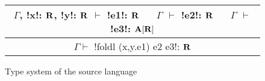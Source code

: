 \begin{figure*}[tb]
    \begin{tabular}{c}
        $\Gamma$, !x!: $\mathbf{R}$, !y!: $\mathbf{R}$ $\vdash$ !e1!: $\mathbf{R}$ 
        $\quad$ $\Gamma$ $\vdash$ !e2!: $\mathbf{R}$
        $\quad$ $\Gamma$ $\vdash$ !e3!: $\mathbf{A}[\mathbf{R}]$
        \\\hline  
        $\Gamma \vdash$ !foldl (x,y.e1) e2 e3!: $\mathbf{R}$
    \end{tabular}
    \vspace{-0.2cm}
    \caption{Type system of the source language}
    \vspace{-0.4cm}
    \label{fig:source_typesystem}
    \end{figure*}